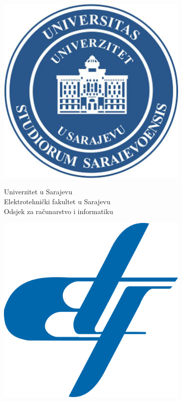 \documentclass[12pt, a4paper]{report}
\theoremstyle{definition}
\begin{document}
	\begin{titlepage}
		\newcommand{\HRule}{\rule{\linewidth}{1mm}} 
		\noindent
		{\large
			\begin{minipage}{0.2\textwidth}
				\begin{center} 
					\includegraphics[width=0.7\textwidth]{unsa.jpg}
				\end{center}
			\end{minipage}
			\begin{minipage}{0.58\textwidth}
				\begin{center} \large
					Univerzitet u Sarajevu\\
					Elektrotehnički fakultet u Sarajevu\\
					Odsjek za računarstvo i informatiku\\
				\end{center}
			\end{minipage}
			\begin{minipage}{0.2\textwidth}
				\begin{center} 
					\includegraphics[width=0.7\textwidth]{ETF_logo.png}
				\end{center}
			\end{minipage}
			\\[6 cm] 
			
}
\end{titlepage}
\end{document}
